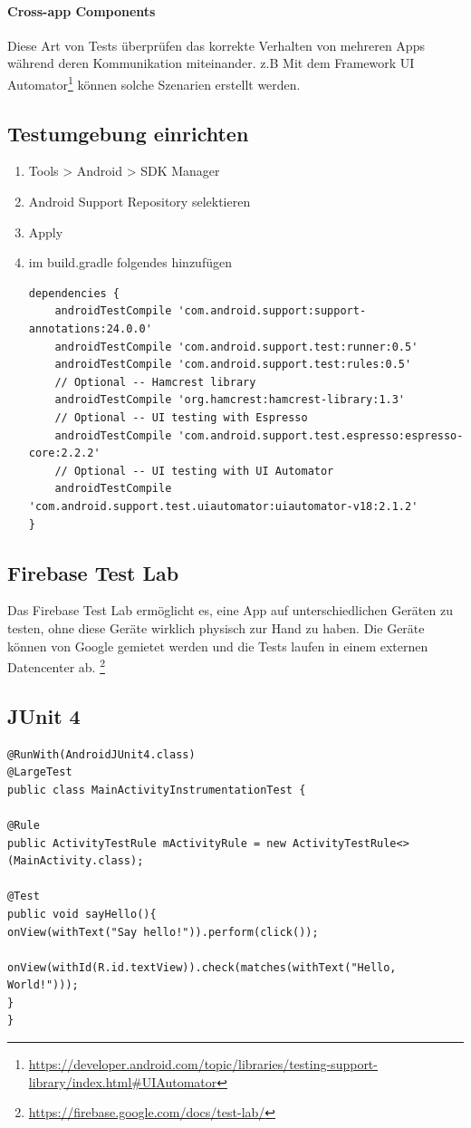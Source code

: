 \paragraph{Cross-app Components}
Diese Art von Tests überprüfen das korrekte Verhalten von mehreren Apps während deren Kommunikation miteinander. z.B Mit dem Framework UI Automator\footnote{\url{https://developer.android.com/topic/libraries/testing-support-library/index.html\#UIAutomator}} können solche Szenarien erstellt werden. 

\subsection{Testumgebung einrichten}
\begin{enumerate}
	\item Tools > Android > SDK Manager
	\item Android Support Repository selektieren
	\item Apply
	\item im build.gradle folgendes hinzufügen
	\begin{lstlisting}[caption=Android Testing Erweiterung im build.gradle]
dependencies {
	androidTestCompile 'com.android.support:support-annotations:24.0.0'
	androidTestCompile 'com.android.support.test:runner:0.5'
	androidTestCompile 'com.android.support.test:rules:0.5'
	// Optional -- Hamcrest library
	androidTestCompile 'org.hamcrest:hamcrest-library:1.3'
	// Optional -- UI testing with Espresso
	androidTestCompile 'com.android.support.test.espresso:espresso-core:2.2.2'
	// Optional -- UI testing with UI Automator
	androidTestCompile 'com.android.support.test.uiautomator:uiautomator-v18:2.1.2'
}
	\end{lstlisting}
\end{enumerate}

\subsection{Firebase Test Lab}
Das Firebase Test Lab ermöglicht es, eine App auf unterschiedlichen Geräten zu testen, ohne diese Geräte wirklich physisch zur Hand zu haben. Die Geräte können von Google gemietet werden und die Tests laufen in einem externen Datencenter ab. \footnote{\url{https://firebase.google.com/docs/test-lab/}}

\subsection{JUnit 4}
\begin{lstlisting}[caption=Andorid JUnit 4 Test Beispiel]
@RunWith(AndroidJUnit4.class)
@LargeTest
public class MainActivityInstrumentationTest {

@Rule
public ActivityTestRule mActivityRule = new ActivityTestRule<>(MainActivity.class);

@Test
public void sayHello(){
onView(withText("Say hello!")).perform(click());

onView(withId(R.id.textView)).check(matches(withText("Hello, World!")));
}
}
\end{lstlisting}

